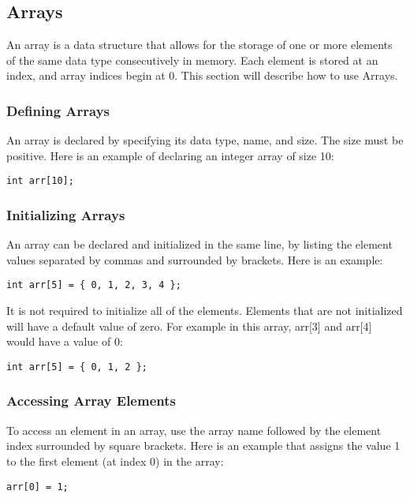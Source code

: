 \documentclass{article}
\begin{document}
\subsection{Arrays}
An array is a data structure that allows for the storage of one or more elements of the same data type consecutively in memory. Each element is stored at an index, and array indices begin at 0. This section will describe how to use Arrays.

\subsubsection{Defining Arrays}
An array is declared by specifying its data type, name, and size. The size must be positive. Here is an example of declaring an integer array of size 10:

 \begin{lstlisting}
int arr[10];
\end{lstlisting}

\subsubsection{Initializing Arrays}
An array can be declared and initialized in the same line, by listing the element values separated by commas and surrounded by brackets. Here is an example:

 \begin{lstlisting}
int arr[5] = { 0, 1, 2, 3, 4 };
\end{lstlisting}

It is not required to initialize all of the elements. Elements that are not initialized will have a default value of zero. For example in this array, arr[3] and arr[4] would have a value of 0:

 \begin{lstlisting}
int arr[5] = { 0, 1, 2 };
\end{lstlisting}

\subsubsection{Accessing Array Elements}
To access an element in an array, use the array name followed by the element index surrounded by square brackets. Here is an example that assigns the value 1 to the first element (at index 0) in the array:

 \begin{lstlisting}
arr[0] = 1;
\end{lstlisting}
\end{document}
